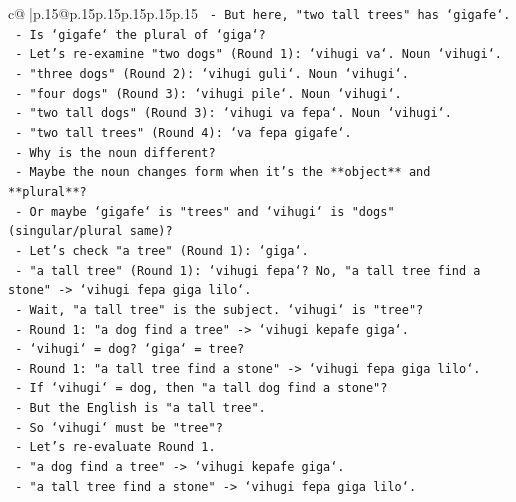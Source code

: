 \documentclass{article}
\begin{document}
{\begin{supertabular}{c@{$\;$}|p{.15\linewidth}@{}p{.15\linewidth}p{.15\linewidth}p{.15\linewidth}p{.15\linewidth}p{.15\linewidth}}
{{{\texttt{        {-}   But here, "two tall trees" has `gigafe`.} \\
\texttt{        {-}   Is `gigafe` the plural of `giga`?} \\
\texttt{        {-}   Let's re{-}examine "two dogs" (Round 1): `vihugi va`. Noun `vihugi`.} \\
\texttt{        {-}   "three dogs" (Round 2): `vihugi guli`. Noun `vihugi`.} \\
\texttt{        {-}   "four dogs" (Round 3): `vihugi pile`. Noun `vihugi`.} \\
\texttt{        {-}   "two tall dogs" (Round 3): `vihugi va fepa`. Noun `vihugi`.} \\
\texttt{        {-}   "two tall trees" (Round 4): `va fepa gigafe`.} \\
\texttt{        {-}   Why is the noun different?} \\
\texttt{        {-}   Maybe the noun changes form when it's the **object** and **plural**?} \\
\texttt{        {-}   Or maybe `gigafe` is "trees" and `vihugi` is "dogs" (singular/plural same)?} \\
\texttt{        {-}   Let's check "a tree" (Round 1): `giga`.} \\
\texttt{        {-}   "a tall tree" (Round 1): `vihugi fepa`? No, "a tall tree find a stone" {-}> `vihugi fepa giga lilo`.} \\
\texttt{            {-}   Wait, "a tall tree" is the subject. `vihugi` is "tree"?} \\
\texttt{            {-}   Round 1: "a dog find a tree" {-}> `vihugi kepafe giga`.} \\
\texttt{                {-}   `vihugi` = dog? `giga` = tree?} \\
\texttt{            {-}   Round 1: "a tall tree find a stone" {-}> `vihugi fepa giga lilo`.} \\
\texttt{                {-}   If `vihugi` = dog, then "a tall dog find a stone"?} \\
\texttt{                {-}   But the English is "a tall tree".} \\
\texttt{                {-}   So `vihugi` must be "tree"?} \\
\texttt{                {-}   Let's re{-}evaluate Round 1.} \\
\texttt{                {-}   "a dog find a tree" {-}> `vihugi kepafe giga`.} \\
\texttt{                {-}   "a tall tree find a stone" {-}> `vihugi fepa giga lilo`.} \\
}}}
\end{supertabular}}
\end{document}
